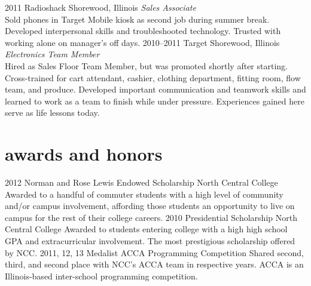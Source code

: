 \documentclass[]{friggeri-cv} %
\begin{document}
\begin{entrylist}
\entry
{2011}
{Radioshack}
{Shorewood, Illinois}
{\emph{Sales Associate} \\
Sold phones in Target Mobile kiosk as second job during summer break.
Developed interpersonal skills and troubleshooted technology.
Trusted with working alone on manager's off days.}
\entry
{2010--2011}
{Target}
{Shorewood, Illinois}
{\emph{Electronics Team Member} \\
Hired as Sales Floor Team Member, but was promoted shortly after starting. Cross-trained for cart attendant, cashier, clothing department, fitting room, flow team, and produce.
Developed important communication and teamwork skills and learned to work as a team to finish while under pressure.
Experiences gained here serve as life lessons today.}
\end{entrylist}


\section{awards and honors}

\begin{entrylist}
\entry
{2012}
{Norman and Rose Lewis Endowed Scholarship}
{North Central College}
{Awarded to a handful of commuter students with a high level of community and/or campus involvement, affording those students an opportunity to live on campus for the rest of their college careers.}
\entry
{2010}
{Presidential Scholarship}
{North Central College}
{Awarded to students entering college with a high high
school GPA and extracurricular involvement.
The most prestigious scholarship offered by NCC.}
\entry
{2011, 12, 13}
{Medalist}
{ACCA Programming Competition}
{Shared second, third, and second place with NCC's ACCA team in respective years.
ACCA is an Illinois-based inter-school programming competition.}
\end{entrylist}

\end{document}

